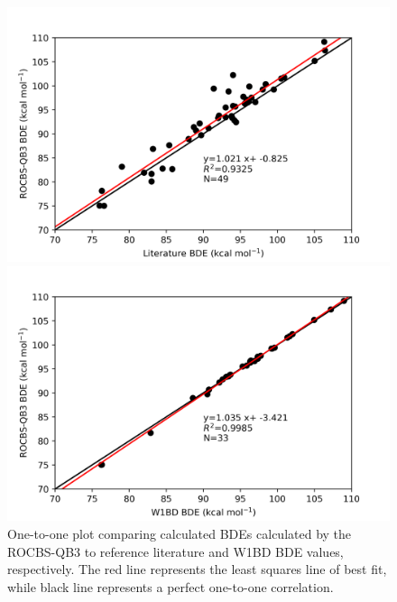 \begin{figure}[H]
  \hspace*{-1.5cm}
  \begin{minipage}{8cm}
    \centering
    \includegraphics[width=\textwidth]{figures/lit-rocbsqb3}
  \end{minipage}%
  \begin{minipage}{8cm}
    \centering
    \includegraphics[width=\textwidth]{figures/w1bd-rocbsqb3}
  \end{minipage}
  \caption[One-to-one plot comparing calculated BDEs calculated by ROCBS-QB3 to literature and W1BD BDEs.]{One-to-one plot comparing calculated BDEs calculated by the ROCBS-QB3 to reference literature\protect\cite{Luo2002} and W1BD BDE values, respectively. The red line represents the least squares line of best fit, while black line represents a perfect one-to-one correlation.}
  \label{fig:1-1-ROCBSQB3}
\end{figure}

